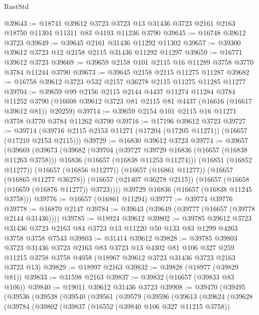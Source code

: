\begin{lexlean}{RustStd}
\begin{coremodule}
@39643 := @18741
    @39612
    @3723
    @3723
    @13
    @31436
    @3723
    @2161
    @2163
    @18750
    @11304
    @11311
    @83
    @4193
    @11236
    @3790
@39645 := @16748 @39612 @3723
@39649 := @39645 @2161 @31436 @11292 @11302
@39657 := @39300 @39612 @3723 @12 @2158 @2115 @31436 @11292 @11297
@39659 := @16771 @39612 @3723
@39669 := @39659 @2158 @101 @2115 @16 @11289 @3758 @3770 @3784 @11244 @3790
@39673 := @39645 @2158 @2115 @11275 @11287
@39682 := @16758 @39612 @3723 @532 @2157 @36278 @2115 @11275 @11285 @11277
@39704 := @39659
    @99
    @2156
    @2115
    @2144
    @4437
    @11274
    @11284
    @3784
    @11252
    @3790
    (@16608 @39612 @3723 @81 @2115 @81 @4437 (@16616 (@16617 @39612 @81)) @20259)
@39714 := @39659 @2154 @101 @2115 @16 @11271 @3758 @3770 @3784 @11262 @3790
@39716 := @17196 @39612 @3723
@39727 := @39714 (@39716 @2115 @2153 @11271 (@17204 (@17205 @11271)) (@16657 (@17210 @2153 @2115)))
@39729 := @16830 @39612 @3723
@39774 := @39657
    (@39669
      (@39673
        (@39682
          (@39704
            (@39727 @39729 @16836 (@16657 (@16838 @11263 @3758)))
            @16836
            (@16657 (@16838 @11253 @11274)))
          (@16851 (@16852 @11277))
          (@16657 (@16856 @11277))
          (@16657 (@16861 @11277))
          (@16657 (@16865 @11277 @36278))
          (@16657 (@21407 @36278 @2115))
          (@16657 (@16658 (@16659 (@16876 @11277)) @3723))))
      @39729
      @16836
      (@16657 (@16838 @11245 @3758)))
@39776 := @16657 (@16861 @11294)
@39777 := @39774 @39776
@39778 := @16870 @2147
@39784 := @39643 (@39649 (@39777 (@16657 (@39778 @2144 @31436))))
@39785 := @18924 @39612
@39802 := @39785
    @39612
    @3723
    @31436
    @3723
    @2163
    @84
    @3723
    @13
    @11220
    @50
    @133
    @83
    @1299
    @4263
    @3758
    @3758
    @7543
@39803 := @31414 @39612
@39828 := @39785
    @39803
    @3723
    @31436
    @3723
    @2163
    @83
    @3723
    @13
    @4302
    @81
    @106
    @327
    @259
    @11215
    @3758
    @3758
    @4058
    (@18967 @39612 @3723 @31436 @3723 @2163 @3723 @13)
@39829 := @18997 @2163
@39832 := @39828 (@18977 (@39829 @81))
@39833 := @31598 @2163
@39837 := @39832 (@16657 (@39833 @83 @106))
@39840 := @19011 @39612 @31436 @3723
@39908 := @39470
    (@39495
      (@39536
        (@39538
          (@39540
            (@39561
              (@39579
                (@39596
                  (@39613
                    (@39624
                      (@39628
                        (@39784
                          (@39802
                            (@39837
                              (@16552 (@39840 @106 @327 @11215 @3758))

\end{coremodule}
\end{lexlean}
